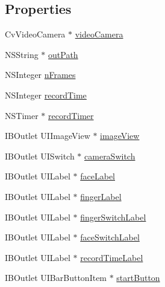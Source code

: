 \subsection*{Properties}
\begin{DoxyCompactItemize}
\item 
Cv\+Video\+Camera $\ast$ \hyperlink{category_m_h_r_main_view_controller_07_08_a82652cbbdc0ac312a50c591870b579c1}{video\+Camera}
\item 
N\+S\+String $\ast$ \hyperlink{category_m_h_r_main_view_controller_07_08_acf930d5712d9bba15886bab49c00f36c}{out\+Path}
\item 
N\+S\+Integer \hyperlink{category_m_h_r_main_view_controller_07_08_aff8ddd68733b8b626fc832ebf2390398}{n\+Frames}
\item 
N\+S\+Integer \hyperlink{category_m_h_r_main_view_controller_07_08_ac15f6b287a439206e9a1a8816248f635}{record\+Time}
\item 
N\+S\+Timer $\ast$ \hyperlink{category_m_h_r_main_view_controller_07_08_a1f1639552968eeba13ed2b4575bea129}{record\+Timer}
\item 
I\+B\+Outlet U\+I\+Image\+View $\ast$ \hyperlink{category_m_h_r_main_view_controller_07_08_ad4a109ef255380e19bcda3c2efb2ce83}{image\+View}
\item 
I\+B\+Outlet U\+I\+Switch $\ast$ \hyperlink{category_m_h_r_main_view_controller_07_08_a64545a3386e0d53f59af539582caafd4}{camera\+Switch}
\item 
I\+B\+Outlet U\+I\+Label $\ast$ \hyperlink{category_m_h_r_main_view_controller_07_08_a2457cf5b05fac6f6cb9483997159f5f6}{face\+Label}
\item 
I\+B\+Outlet U\+I\+Label $\ast$ \hyperlink{category_m_h_r_main_view_controller_07_08_a67cd700e56983a4a3a1e6da4569bafe9}{finger\+Label}
\item 
I\+B\+Outlet U\+I\+Label $\ast$ \hyperlink{category_m_h_r_main_view_controller_07_08_a1419b93d2152551aec5038ff468f3ff6}{finger\+Switch\+Label}
\item 
I\+B\+Outlet U\+I\+Label $\ast$ \hyperlink{category_m_h_r_main_view_controller_07_08_addd32f0cbd1a4d5bfe69a837b3505ed6}{face\+Switch\+Label}
\item 
I\+B\+Outlet U\+I\+Label $\ast$ \hyperlink{category_m_h_r_main_view_controller_07_08_a63bbbfafd497288fe3035250ab5d9fcb}{record\+Time\+Label}
\item 
I\+B\+Outlet U\+I\+Bar\+Button\+Item $\ast$ \hyperlink{category_m_h_r_main_view_controller_07_08_a98273435af4fbcd1e437f257bb9ced12}{start\+Button}
\item 

\end{DoxyCompactItemize}
